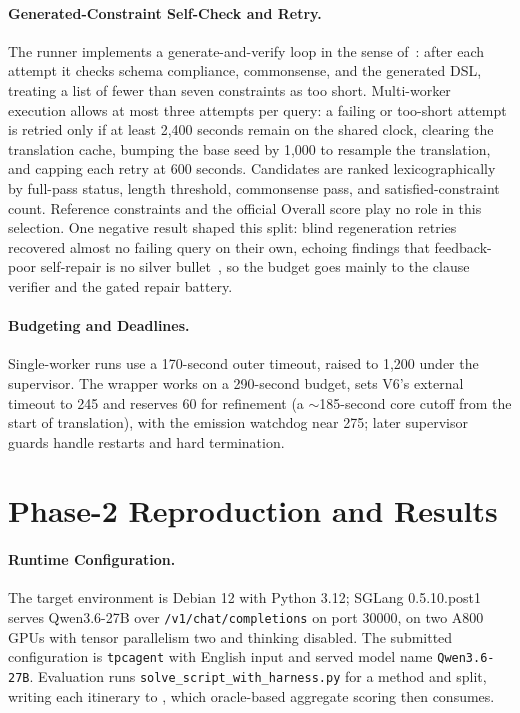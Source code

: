 \documentclass{article}
\begin{document}
\paragraph{Generated-Constraint Self-Check and Retry.}
The runner implements a generate-and-verify loop in the sense
of~\cite{llmmodulo}: after each attempt it checks schema compliance, commonsense, and the
generated DSL, treating a list of fewer than seven constraints as too
short. Multi-worker execution allows at most three attempts per query: a
failing or too-short attempt is retried only if at least 2,400 seconds
remain on the shared clock, clearing the translation cache, bumping the
base seed by 1,000 to resample the translation, and capping each retry at 600 seconds. Candidates are
ranked lexicographically by full-pass status, length threshold, commonsense
pass, and satisfied-constraint count. Reference constraints and the official Overall score play no role in this
selection. One negative result shaped this split: blind regeneration retries recovered
almost no failing query on their own, echoing findings that feedback-poor
self-repair is no silver bullet~\cite{selfrepair}, so the budget goes
mainly to the clause verifier and the gated repair battery.
 
\paragraph{Budgeting and Deadlines.}
Single-worker runs use a 170-second outer timeout, raised to 1,200 under
the supervisor. The wrapper works on a 290-second budget, sets V6's
external timeout to 245 and reserves 60 for refinement (a $\sim$185-second
core cutoff from the start of translation), with the emission watchdog near
275; later supervisor guards handle restarts and hard termination.
 
\section{Phase-2 Reproduction and Results}
 
\paragraph{Runtime Configuration.}
The target environment is Debian 12 with Python 3.12; SGLang 0.5.10.post1
serves Qwen3.6-27B over \texttt{/v1/chat/completions} on port 30000, on two
A800 GPUs with tensor parallelism two and thinking disabled. The submitted
configuration is \texttt{tpcagent} with English input and served model name
\texttt{Qwen3.6-27B}. Evaluation runs
\texttt{solve\_script\_with\_harness.py} for a method and split, writing
each itinerary to , which oracle-based
aggregate scoring then consumes.
 
\end{document}
